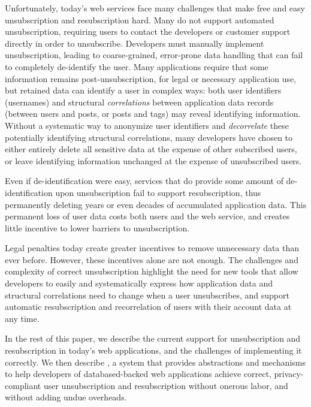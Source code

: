Unfortunately, today's web services face many challenges that make free and easy unsubscription and
resubscription hard. Many do not support automated unsubscription, requiring users to 
contact the developers or customer support directly in order to unsubscribe.
Developers must manually implement unsubscription, leading to coarse-grained, error-prone data
handling that can fail to completely de-identify the user. Many applications require that some
information remains post-unsubscription, for legal or necessary application use, but retained data
can identify a user in complex ways: both user identifiers (\eg usernames) and structural
\emph{correlations} between application data records (\eg between users and posts, or posts and
tags) may reveal identifying information.  Without a systematic way to anonymize user identifiers
and \emph{decorrelate} these potentially identifying structural correlations, many developers have
chosen to either entirely delete all sensitive data at the expense of other subscribed users, or
leave identifying information unchanged at the expense of unsubscribed users.

Even if de-identification were easy, services that do provide some amount of de-identification upon
unsubscription fail to support resubscription, thus permanently deleting years or even decades of
accumulated application data.  This permanent loss of user data costs both users and the web
service, and creates little incentive to lower barriers to unsubscription.  

Legal penalties today create greater incentives to remove unnecessary data than ever before.
However, these incentives alone are not enough. The challenges and complexity of
correct unsubscription highlight the need for new tools that allow developers to easily and
systematically express how application data and structural correlations need to change when a user
unsubscribes, and support automatic resubscription and recorrelation of users with their account
data at any time.
%

In the rest of this paper, we describe the current support for unsubscription and resubscription in
today's web applications, and the challenges of implementing it correctly.  We then describe \sys, a
system that provides abstractions and mechanisms to help developers of databased-backed web
applications achieve correct, privacy-compliant user unsubscription and resubscription without
onerous labor, and without adding undue overheads.
